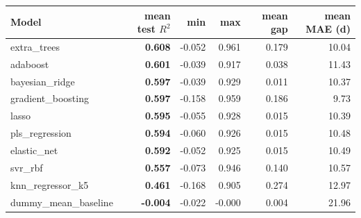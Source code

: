 \begin{tabular}{lrrrrr}
\toprule
Model & mean test $R^2$ & min & max & mean gap & mean MAE (d) \\
\midrule
extra\_trees & \textbf{0.608} & -0.052 & 0.961 & 0.179 & 10.04 \\
adaboost & \textbf{0.601} & -0.039 & 0.917 & 0.038 & 11.43 \\
bayesian\_ridge & \textbf{0.597} & -0.039 & 0.929 & 0.011 & 10.37 \\
gradient\_boosting & \textbf{0.597} & -0.158 & 0.959 & 0.186 & 9.73 \\
lasso & \textbf{0.595} & -0.055 & 0.928 & 0.015 & 10.39 \\
pls\_regression & \textbf{0.594} & -0.060 & 0.926 & 0.015 & 10.48 \\
elastic\_net & \textbf{0.592} & -0.052 & 0.925 & 0.015 & 10.49 \\
svr\_rbf & \textbf{0.557} & -0.073 & 0.946 & 0.140 & 10.57 \\
knn\_regressor\_k5 & \textbf{0.461} & -0.168 & 0.905 & 0.274 & 12.97 \\
dummy\_mean\_baseline & \textbf{-0.004} & -0.022 & -0.000 & 0.004 & 21.96 \\
\bottomrule
\end{tabular}